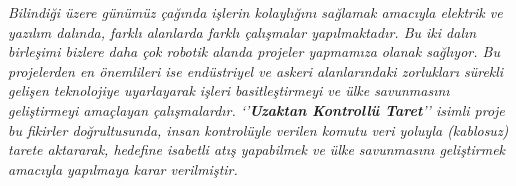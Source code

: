
\label{CH:Bolumtesekkurler}

\textit{Bilindiği üzere günümüz çağında işlerin kolaylığını sağlamak amacıyla elektrik ve yazılım dalında, farklı alanlarda farklı çalışmalar yapılmaktadır. Bu iki dalın birleşimi bizlere daha çok robotik alanda projeler yapmamıza olanak sağlıyor. Bu projelerden en önemlileri ise endüstriyel ve askeri alanlarındaki zorlukları sürekli gelişen teknolojiye uyarlayarak işleri basitleştirmeyi ve ülke savunmasını geliştirmeyi amaçlayan çalışmalardır. ‘’\textbf{Uzaktan Kontrollü Taret}’’ isimli proje bu fikirler doğrultusunda, insan kontrolüyle verilen komutu veri yoluyla (kablosuz) tarete aktararak, hedefine isabetli atış yapabilmek ve ülke savunmasını geliştirmek amacıyla yapılmaya karar verilmiştir.}

\clearpage
